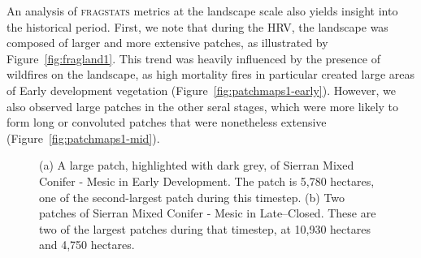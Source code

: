 

An analysis of \textsc{fragstats} metrics at the landscape scale also yields insight into the historical period. First, we note that during the HRV, the landscape was composed of larger and more extensive patches, as illustrated by Figure~\ref{fig:fragland1}. This trend was heavily influenced by the presence of wildfires on the landscape, as high mortality fires in particular created large areas of Early development vegetation (Figure~\ref{fig:patchmaps1-early}). However, we also observed large patches in the other seral stages, which were more likely to form long or convoluted patches that were nonetheless extensive (Figure~\ref{fig:patchmaps1-mid}).

\begin{figure}[!htbp]
  \centering
  \caption{(a) A large patch, highlighted with dark grey, of Sierran Mixed Conifer - Mesic in Early Development. The patch is 5,780 hectares, one of the second-largest patch during this timestep. (b) Two patches of Sierran Mixed Conifer - Mesic in Late--Closed. These are two of the largest patches during that timestep, at 10,930 hectares and 4,750 hectares.} 
  \label{fig:patchmaps1}
\end{figure}


